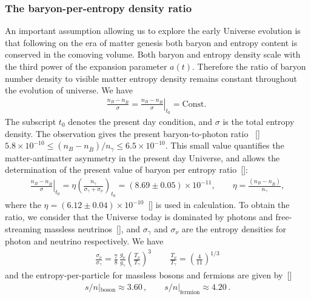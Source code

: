 \subsubsection{The baryon-per-entropy density ratio}
An important assumption allowing us to explore the early Universe evolution is that following on the era of matter genesis both baryon and entropy content is conserved in the comoving volume. Both baryon and entropy density scale with the third power of the expansion parameter $a(t)$. Therefore the ratio of baryon number density to visible matter entropy density remains constant throughout the evolution of universe. We have
\begin{align}
\frac{n_B-n_{\overline{B}}}{\sigma}= \left.\frac{n_B-n_{\overline{B}}}{ \sigma}\right|_{t_0}=\mathrm{Const.}\;
\end{align}
The subscript $t_0$ denotes the present day condition, and $\sigma$ is the total entropy density.
The observation gives the present baryon-to-photon ratio ~[\cite{ParticleDataGroup:2022pth}] $5.8 \times 10^{-10} \leqslant(n_B-n_{\overline{B}})/n_\gamma\leqslant6.5\times10^{-10}$. This small value quantifies the matter-antimatter asymmetry in the present day Universe, and allows the determination of the present value of baryon per entropy ratio~[\cite{Rafelski:2019twp,Fromerth:2002wb,Fromerth:2012fe}]:
\begin{align}\label{BaryonEntropyRatio}
\left.\frac{n_B-n_{\overline{B}}}{ \sigma}\right|_{t_0}=\eta\left(\frac{n_\gamma}{\sigma_\gamma+\sigma_\nu}\right)_{\!t_0}\!\!\!\!=(8.69\pm0.05)\!\!\times\!\!10^{-11},\qquad \eta=\frac{(n_B-n_{\overline{B}})}{n_\gamma},
\end{align}
where the $\eta=(6.12\pm0.04)\times10^{-10}$~[\cite{ParticleDataGroup:2022pth}] is used in calculation. To obtain the ratio, we consider that the Universe today is dominated by photons and free-streaming massless neutrinos~[\cite{Birrell:2012gg}], and $\sigma_\gamma$ and $\sigma_\nu$ are the entropy densities for photon and neutrino respectively. We have
\begin{align}
    \frac{\sigma_\nu}{\sigma_\gamma}=\frac{7}{8}\,\frac{g_\nu}{g_\gamma}\left(\frac{T_\nu}{T_\gamma}\right)^3\,\qquad\frac{T_\nu}{T_\gamma}=\left(\frac{4}{11}\right)^{1/3}
\end{align}
and the entropy-per-particle for massless bosons and fermions are given by~[\cite{Fromerth:2012fe}]
\begin{align}
s/n|_\mathrm{boson}\approx 3.60\,,\qquad
s/n|_\mathrm{fermion}\approx 4.20\,.
\end{align}
